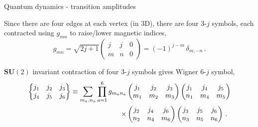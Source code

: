 \documentclass{beamer}
\begin{document}
\begin{frame}{Quantum dynamics - transition amplitudes}
    \begin{list}{\maltese}{\leftmargin=1em \itemindent=0em}
        \vspace{-2pt}
        \item<1-> Since there are four edges at each vertex (in 3D), there are four 3-$j$ symbols, each contracted using $g_{mn}$ to raise/lower magnetic indices,
        \begin{equation}
            g_{mn}=\sqrt{2j+1}
            \begin{pmatrix}
                j & j & 0 \\
                m & n & 0
            \end{pmatrix}
            =(-1)^{j-m}\,\delta_{m,-n}\,.
        \end{equation}
        \vspace{-7pt}
        \item<2-> $\mathbf{SU}(2)$ invariant contraction of four 3-$j$ symbols gives Wigner 6-$j$ symbol,
        \begin{align}
            \begin{Bmatrix}
                j_1 & j_2 & j_3 \\
                j_4 & j_5 & j_6
            \end{Bmatrix}
            \equiv\sum_{m_a,n_a}\prod_{a=1}^{6} g_{m_an_a}&
            \begin{pmatrix}
                j_1 & j_2 & j_3 \\
                m_1 & m_2 & m_3
            \end{pmatrix}
            \begin{pmatrix}
                j_1 & j_4 & j_5 \\
                n_1 & m_4 & m_5
            \end{pmatrix}\notag\\
            \times&
            \begin{pmatrix}
                j_2 & j_4 & j_6 \\
                n_2 & n_4 & m_6
            \end{pmatrix}
            \begin{pmatrix}
                j_3 & j_5 & j_6 \\
                n_3 & n_5 & n_6
            \end{pmatrix}\,.
        \end{align}
        \vspace{-6pt}

\end{list}
\end{frame}
\end{document}
